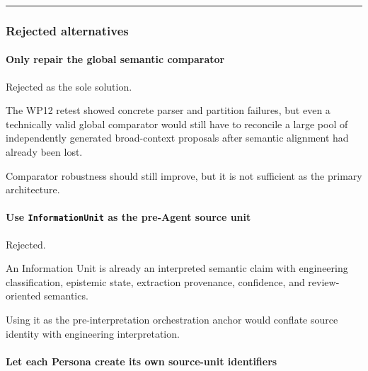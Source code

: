 \begin{center}\rule{0.5\linewidth}{0.5pt}\end{center}

\hypertarget{rejected-alternatives-5}{%
\subsubsection{Rejected alternatives}\label{rejected-alternatives-5}}

\hypertarget{only-repair-the-global-semantic-comparator}{%
\paragraph{Only repair the global semantic comparator}\label{only-repair-the-global-semantic-comparator}}

Rejected as the sole solution.

The WP12 retest showed concrete parser and partition failures, but even a technically valid global comparator would still have to reconcile a large pool of independently generated broad-context proposals after semantic alignment had already been lost.

Comparator robustness should still improve, but it is not sufficient as the primary architecture.

\hypertarget{use-informationunit-as-the-pre-agent-source-unit}{%
\paragraph{\texorpdfstring{Use \texttt{InformationUnit} as the pre-Agent source unit}{Use InformationUnit as the pre-Agent source unit}}\label{use-informationunit-as-the-pre-agent-source-unit}}

Rejected.

An Information Unit is already an interpreted semantic claim with engineering classification, epistemic state, extraction provenance, confidence, and review-oriented semantics.

Using it as the pre-interpretation orchestration anchor would conflate source identity with engineering interpretation.

\hypertarget{let-each-persona-create-its-own-source-unit-identifiers}{%
\paragraph{Let each Persona create its own source-unit identifiers}\label{let-each-persona-create-its-own-source-unit-identifiers}}

